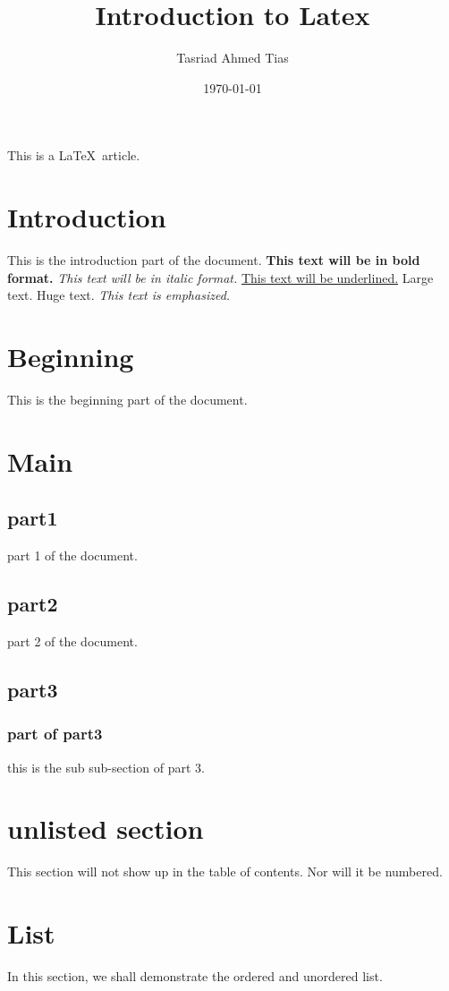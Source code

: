 \documentclass[14pt]{article}
\title{Introduction to Latex}
\author{Tasriad Ahmed Tias}
\date{\today}
\begin{document}
\maketitle %
\tableofcontents %
\newpage
This is a \LaTeX\ article.
\section{Introduction}
This is the introduction part of the document.\newline
\textbf{This text will be in bold format.}\newline
\textit{This text will be in italic format.}\newline
\underline {This text will be underlined.}\newline
{\Large Large text.}\newline
{\Huge Huge text.}\newline
\emph{This text is emphasized.}
\section{Beginning}
This is the beginning part of the document.
\section{Main}
\subsection{part1}
part 1 of the document.
\subsection{part2}
part 2 of the document.
\subsection{part3}
\subsubsection{part of part3}
this is the sub sub-section of part 3.
\section*{unlisted section}
This section will not show up in the table of contents. Nor will it be numbered.
\newpage
\section{List}
In this section, we shall demonstrate the ordered and unordered list.
\end{document}
